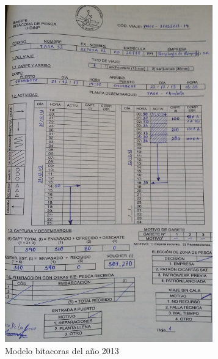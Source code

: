 \documentclass[a4paper,oneside,11pt]{book}
\begin{document}
\begin{figure}
\centering
\includegraphics[width=0.8\linewidth]{imagen_Manual_PBP/nueva}
\caption{Modelo bitacoras del año 2013}
\label{fig:inter}
\end{figure}
\end{document}
